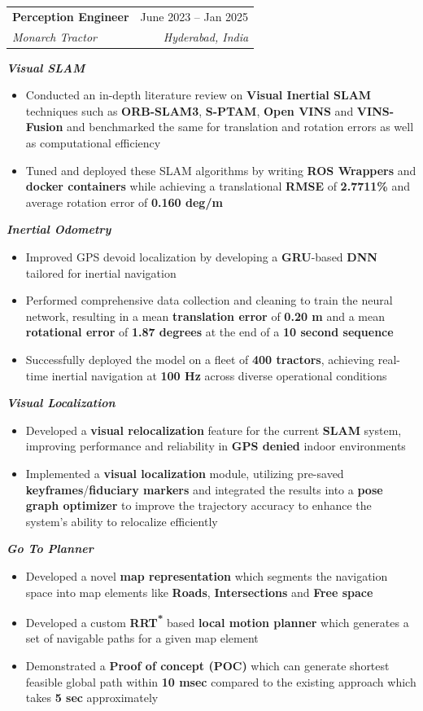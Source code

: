 \documentclass[letterpaper,11pt]{article}
\makeatletter
\newcommand{\resumeItem}[1]{
  \item\small{
    {#1 \vspace{-2pt}}
  }
}
\newcommand{\resumeSubheading}[4]{
  \vspace{-2pt}\item
    \begin{tabular*}{0.97\textwidth}[t]{l@{\extracolsep{\fill}}r}
      \textbf{#1} & #2 \\
      \textit{\small#3} & \textit{\small #4} \\
    \end{tabular*}\vspace{-7pt}
}
\newcommand{\resumeItemListStart}{\begin{itemize}}
\newcommand{\resumeItemListEnd}{\end{itemize}\vspace{-5pt}}
\makeatother
\begin{document}
   \resumeSubheading
      {Perception Engineer}{June 2023 -- Jan 2025}
      {Monarch Tractor}{Hyderabad, India}
      
      \vspace{2pt}
      \textit{\small \textbf{Visual SLAM}}
      \resumeItemListStart
        \resumeItem{Conducted an in-depth literature review on \textbf{Visual Inertial SLAM} techniques such as \textbf{ORB-SLAM3}, \textbf{S-PTAM}, \textbf{Open VINS} and \textbf{VINS-Fusion} and benchmarked the same for translation and rotation errors as well as computational efficiency}
        \resumeItem{Tuned and deployed these SLAM algorithms by writing \textbf{ROS Wrappers} and \textbf{docker containers} while achieving a translational \textbf{RMSE} of \textbf{2.7711\%} and average rotation error of \textbf{0.160 deg/m}}
      \resumeItemListEnd
      
      \vspace{2pt}
      \textit{\small \textbf{Inertial Odometry}}
      \resumeItemListStart
        \resumeItem{Improved GPS devoid localization by developing a \textbf{GRU}-based \textbf{DNN} tailored for inertial navigation}
        \resumeItem{Performed comprehensive data collection and cleaning to train the neural network, resulting in a mean \textbf{translation error} of \textbf{0.20 m} and a mean \textbf{rotational error} of \textbf{1.87 degrees} at the end of a \textbf{10 second sequence}}
        \resumeItem{Successfully deployed the model on a fleet of \textbf{400 tractors}, achieving real-time inertial navigation at \textbf{100 Hz} across diverse operational conditions}
      \resumeItemListEnd
      
      \vspace{2pt}
      \textit{\small \textbf{Visual Localization}}
      \resumeItemListStart
        \resumeItem{Developed a \textbf{visual relocalization} feature for the current \textbf{SLAM} system, improving performance and reliability in \textbf{GPS denied} indoor environments}
        \resumeItem{Implemented a \textbf{visual localization} module, utilizing pre-saved \textbf{keyframes}/\textbf{fiduciary markers} and integrated the results into a \textbf{pose graph optimizer} to improve the trajectory accuracy to enhance the system's ability to relocalize efficiently}
      \resumeItemListEnd
      
      \vspace{2pt}
      \textit{\small \textbf{Go To Planner}}
      \resumeItemListStart
        \resumeItem{Developed a novel \textbf{map representation} which segments the navigation space into map elements like \textbf{Roads}, \textbf{Intersections} and \textbf{Free space}}
        \resumeItem{Developed a custom \textbf{RRT\textsuperscript{*}} based \textbf{local motion planner} which generates a set of navigable paths for a given map element}
        \resumeItem{Demonstrated a \textbf{Proof of concept (POC)} which can generate shortest feasible global path within \textbf{10 msec} compared to the existing approach which takes \textbf{5 sec} approximately}
      \resumeItemListEnd
      
\end{document}
